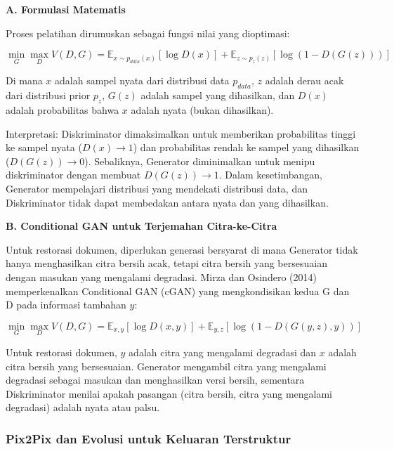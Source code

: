 \documentclass[12pt,a4paper]{article}
\begin{document}
\vspace{0.5ex}
\noindent\textbf{A. Formulasi Matematis}

Proses pelatihan dirumuskan sebagai fungsi nilai yang dioptimasi:

\begin{equation}
\min_G \max_D V(D, G) = \mathbb{E}_{x \sim p_{data}(x)}[\log D(x)] + \mathbb{E}_{z \sim p_z(z)}[\log(1 - D(G(z)))]
\end{equation}

Di mana $x$ adalah sampel nyata dari distribusi data $p_{data}$, $z$ adalah derau acak dari distribusi prior $p_z$, $G(z)$ adalah sampel yang dihasilkan, dan $D(x)$ adalah probabilitas bahwa $x$ adalah nyata (bukan dihasilkan).

Interpretasi: Diskriminator dimaksimalkan untuk memberikan probabilitas tinggi ke sampel nyata ($D(x) \to 1$) dan probabilitas rendah ke sampel yang dihasilkan ($D(G(z)) \to 0$). Sebaliknya, Generator diminimalkan untuk menipu diskriminator dengan membuat $D(G(z)) \to 1$. Dalam kesetimbangan, Generator mempelajari distribusi yang mendekati distribusi data, dan Diskriminator tidak dapat membedakan antara nyata dan yang dihasilkan.

\vspace{0.5ex}
\noindent\textbf{B. Conditional GAN untuk Terjemahan Citra-ke-Citra}

Untuk restorasi dokumen, diperlukan generasi bersyarat di mana Generator tidak hanya menghasilkan citra bersih acak, tetapi citra bersih yang bersesuaian dengan masukan yang mengalami degradasi. Mirza dan Osindero (2014) memperkenalkan Conditional GAN (cGAN) yang mengkondisikan kedua G dan D pada informasi tambahan $y$:

\begin{equation}
\min_G \max_D V(D, G) = \mathbb{E}_{x, y}[\log D(x, y)] + \mathbb{E}_{y, z}[\log(1 - D(G(y, z), y))]
\end{equation}

Untuk restorasi dokumen, $y$ adalah citra yang mengalami degradasi dan $x$ adalah citra bersih yang bersesuaian. Generator mengambil citra yang mengalami degradasi sebagai masukan dan menghasilkan versi bersih, sementara Diskriminator menilai apakah pasangan (citra bersih, citra yang mengalami degradasi) adalah nyata atau palsu.

\subsubsection{Pix2Pix dan Evolusi untuk Keluaran Terstruktur}
\label{subsubsec:pix2pix-evolution}
\end{document}
